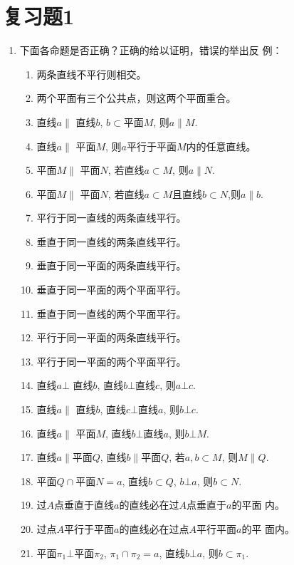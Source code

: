 \begin{figure}[htp]
    \centering
    
    \caption{}
\end{figure}


\section*{复习题1}
\begin{enumerate}
    \item 下面各命题是否正确？正确的给以证明，错误的举出反
    例：
\begin{enumerate}[(1)]
\item 两条直线不平行则相交。
\item 两个平面有三个公共点，则这两个平面重合。
\item 直线$a\parallel$ 直线$b$, $b\subset$平面$M$, 则$a\parallel M$.
\item 直线$a\parallel$ 平面$M$, 则$a$平行于平面$M$内的任意直线。
\item 平面$M\parallel$ 平面$N$, 若直线$a\subset M$, 则$a\parallel N$.
\item 平面$M\parallel$ 平面$N$, 若直线$a\subset M$且直线$b\subset N$,则$a\parallel b$.
\item 平行于同一直线的两条直线平行。
\item 垂直于同一直线的两条直线平行。
\item 垂直于同一平面的两条直线平行。
\item 垂直于同一平面的两个平面平行。
\item 垂直于同一直线的两个平面平行。
\item 平行于同一平面的两条直线平行。
\item 平行于同一平面的两个平面平行。
\item 直线$a\bot$ 直线$b$, 直线$b\bot $直线$c$, 则$a\bot c$.
\item 直线$a\parallel$ 直线$b$, 直线$c\bot $直线$a$, 则$b\bot c$.
\item 直线$a\parallel$ 平面$M$, 直线$b\bot $直线$a$, 则$b\bot M$.
\item 直线$a\parallel $平面$Q$, 直线$b\parallel $平面$Q$, 若$a,b\subset M$, 则$M\parallel Q$.
\item 平面$Q\cap $平面$N=a$, 直线$b\subset Q$, $b\bot a$, 则$b\subset N$.
\item 过$A$点垂直于直线$a$的直线必在过$A$点垂直于$a$的平面
内。
\item 过点$A$平行于平面$a$的直线必在过点$A$平行平面$a$的平
面内。
\item 平面$\pi_1\bot $平面$\pi_2$, $\pi_1\cap \pi_2=a$, 直线$b\bot a$, 则$b\subset \pi_1$.

\end{enumerate}
\end{enumerate}
